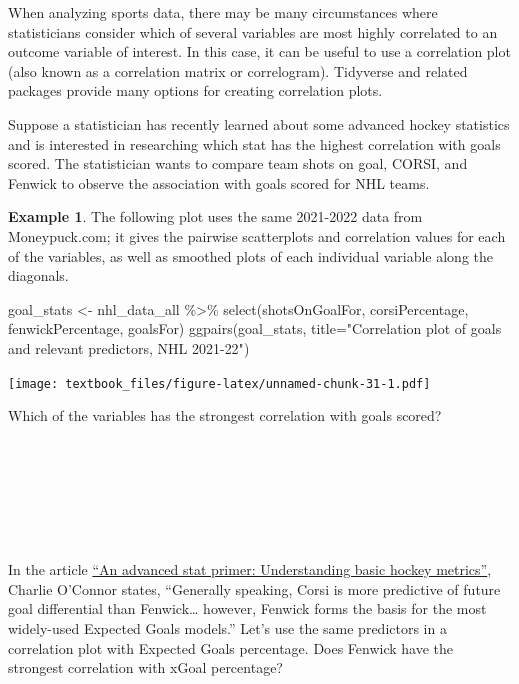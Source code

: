 \documentclass[
  11pt,
]{book}
\newenvironment{Shaded}{\begin{snugshade}}{\end{snugshade}}
\newcommand{\AttributeTok}[1]{\textcolor[rgb]{0.77,0.63,0.00}{#1}}
\newcommand{\FunctionTok}[1]{\textcolor[rgb]{0.00,0.00,0.00}{#1}}
\newcommand{\NormalTok}[1]{#1}
\newcommand{\OtherTok}[1]{\textcolor[rgb]{0.56,0.35,0.01}{#1}}
\newcommand{\SpecialCharTok}[1]{\textcolor[rgb]{0.00,0.00,0.00}{#1}}
\newcommand{\StringTok}[1]{\textcolor[rgb]{0.31,0.60,0.02}{#1}}
\theoremstyle{definition}
\theoremstyle{definition}
\newtheorem{example}{Example}[chapter]
\theoremstyle{definition}
\theoremstyle{definition}
\theoremstyle{remark}
\begin{document}
When analyzing sports data, there may be many circumstances where statisticians consider which of several variables are most highly correlated to an outcome variable of interest. In this case, it can be useful to use a correlation plot (also known as a correlation matrix or correlogram). Tidyverse and related packages provide many options for creating correlation plots.

Suppose a statistician has recently learned about some advanced hockey statistics and is interested in researching which stat has the highest correlation with goals scored. The statistician wants to compare team shots on goal, CORSI, and Fenwick to observe the association with goals scored for NHL teams.

\begin{example}
The following plot uses the same 2021-2022 data from Moneypuck.com; it gives the pairwise scatterplots and correlation values for each of the variables, as well as smoothed plots of each individual variable along the diagonals.
\end{example}

\begin{Shaded}
\begin{Highlighting}[]
\NormalTok{goal\_stats }\OtherTok{\textless{}{-}}\NormalTok{ nhl\_data\_all }\SpecialCharTok{\%\textgreater{}\%} 
  \FunctionTok{select}\NormalTok{(shotsOnGoalFor, corsiPercentage, fenwickPercentage, goalsFor)}
\FunctionTok{ggpairs}\NormalTok{(goal\_stats, }
        \AttributeTok{title=}\StringTok{"Correlation plot of goals and relevant predictors, NHL 2021{-}22"}\NormalTok{)}
\end{Highlighting}
\end{Shaded}

\texttt{[image: textbook\_files/figure-latex/unnamed-chunk-31-1.pdf]}

Which of the variables has the strongest correlation with goals scored?\\
\strut \\
\strut \\
\strut \\
\strut \\

In the article \href{https://theathletic.com/121980/2017/10/09/an-advanced-stat-primer-understanding-basic-hockey-metrics/}{``An advanced stat primer: Understanding basic hockey metrics''}, Charlie O'Connor states, ``Generally speaking, Corsi is more predictive of future goal differential than Fenwick\ldots{} however, Fenwick forms the basis for the most widely-used Expected Goals models.'' Let's use the same predictors in a correlation plot with Expected Goals percentage. Does Fenwick have the strongest correlation with xGoal percentage?
\end{document}
